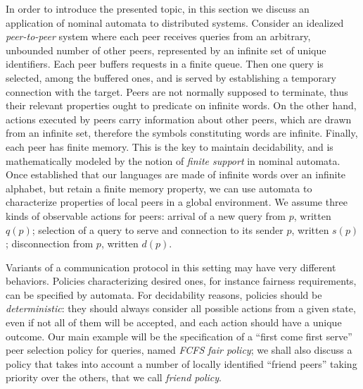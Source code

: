 
In order to introduce the presented topic, in this section we discuss an application of nominal automata to distributed systems. Consider an idealized \emph{peer-to-peer} system where each peer receives queries from an arbitrary, unbounded number of other peers, represented by an infinite set of unique identifiers. Each peer buffers requests in a finite queue. Then one query is selected, among the buffered ones, and is served by establishing a temporary connection with the target. Peers are not normally supposed to terminate, thus their relevant properties ought to predicate on infinite words. On the other hand, actions executed by peers carry information about other peers, which are drawn from an infinite set, therefore the symbols constituting words are infinite. Finally, each peer has finite memory. This is the key to maintain decidability, and is mathematically modeled by the notion of \emph{finite support} in nominal automata. Once established that our languages are made of infinite words over an infinite alphabet, but retain a finite memory property, we can use automata to characterize properties of local peers in a global environment. 
%
We assume three kinds of observable actions for peers: arrival of a new query from $p$, written $q(p)$; selection of a query to serve and connection to its sender $p$, written $s(p)$; disconnection from $p$, written $d(p)$.


Variants of a communication protocol in this setting may have very different behaviors. Policies characterizing desired ones, for instance fairness requirements, can be specified by automata. For decidability reasons, policies should be \emph{deterministic}: they should always consider all possible actions from a given state, even if not all of them will be accepted, and each action should have a unique outcome. 
%
Our main example will be the specification of a ``first come first serve'' peer selection policy for queries, named \emph{FCFS fair policy}; we shall also discuss a policy that takes into account a number of locally identified ``friend peers'' taking priority over the others, that we call \emph{friend policy}. 

